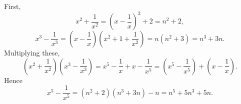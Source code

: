 First,
\[x^2+\dfrac{1}{x^2}=\left(x-\dfrac{1}{x}\right)^2+2=n^2+2,\]
\[x^3-\dfrac{1}{x^3}=\left(x-\dfrac{1}{x}\right)\left(x^2+1+\dfrac{1}{x^2}\right)=n\left(n^2+3\right)=n^3+3n .\]
Multiplying these,
\[\left(x^2+\dfrac{1}{x^2}\right)\left(x^3-\dfrac{1}{x^3}\right)=x^5-\dfrac{1}{x}+x-\dfrac{1}{x^5}=\left(x^5-\dfrac{1}{x^5}\right)+\left(x-\dfrac{1}{x}\right).\]
Hence
\[x^5-\dfrac{1}{x^5}=\left(n^2+2\right)\left(n^3+3n\right)-n=\boxed{n^5+5n^3+5n}.\]
